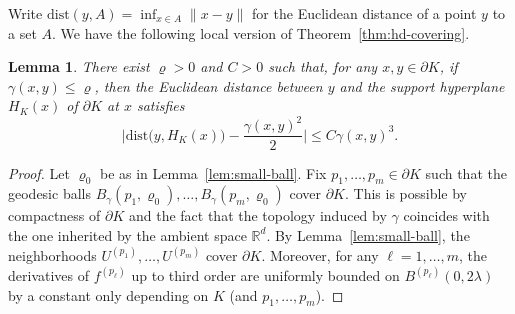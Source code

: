 \documentclass[a4paper,12pt,reqno]{amsart}
\newtheorem{lem}[thm]{Lemma}
\theoremstyle{definition}
\newcommand{\IR}{\mathbb{R}}
\newcommand{\dist}{\mathrm{dist}}
\begin{document}
Write $\dist(y,A)=\inf_{x\in A}\|x-y\|$ for the Euclidean distance of a point $y$ to a set $A$. We have the following local version of Theorem~\ref{thm:hd-covering}. 

\begin{lem}\label{lem:hd-covering}
There exist $\varrho>0$ and $C>0$ such that, for any $x,y\in \partial K$, if $\gamma(x,y)\le \varrho$, then the Euclidean distance between $y$ and the support hyperplane $H_K(x)$ of $\partial K$ at $x$ satisfies
\[
\Big|\dist\big(y,H_K(x)\big)-\frac{\gamma(x,y)^2}{2}\Big|\le C\gamma(x,y)^3.
\]
\end{lem}
\begin{proof}
Let $\varrho_0$ be as in Lemma~\ref{lem:small-ball}. Fix $p_1,\dots,p_m\in \partial K$ such that the geodesic balls $B_{\gamma}(p_{1},\varrho_0),\dots,B_{\gamma}(p_{m},\varrho_0)$ cover $\partial K$. This is possible by compactness of $\partial K$ and the fact that the topology induced by $\gamma$ coincides with the one inherited by the ambient space $\IR^d$. By Lemma~\ref{lem:small-ball}, the neighborhoods $U^{(p_1)},\dots,U^{(p_{m})}$ cover $\partial K$. Moreover, for any $\ell=1,\dots,m$, the derivatives of $f^{(p_{\ell})}$ up to third order are uniformly bounded on $B^{(p_{\ell})}(0,2\lambda)$ by a constant only depending on $K$ (and $p_1,\dots,p_m$).


\end{proof}
\end{document}
